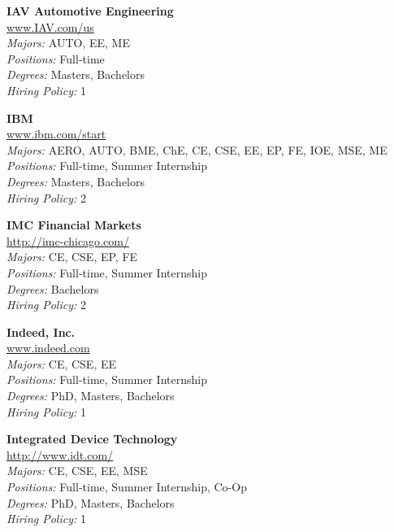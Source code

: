 \documentclass[twoside]{article}
\begin{document}
\begin{center}
\begin{multicols}{3}
\begin{minipage}{.9\columnwidth}{\Large\bf IAV Automotive Engineering }\\
	\url{www.IAV.com/us}\\
	\emph{Majors:} AUTO, EE, ME\\
	\emph{Positions:} Full-time\\
	\emph{Degrees:} Masters, Bachelors\\
	\emph{Hiring Policy:} 1\\
\end{minipage}
 
\begin{minipage}{.9\columnwidth}{\Large\bf IBM }\\
	\url{www.ibm.com/start}\\
	\emph{Majors:} AERO, AUTO, BME, ChE, CE, CSE, EE, EP, FE, IOE, MSE, ME\\
	\emph{Positions:} Full-time, Summer Internship\\
	\emph{Degrees:} Masters, Bachelors\\
	\emph{Hiring Policy:} 2\\
\end{minipage}
 
\begin{minipage}{.9\columnwidth}{\Large\bf IMC Financial Markets }\\
	\url{http://imc-chicago.com/}\\
	\emph{Majors:} CE, CSE, EP, FE\\
	\emph{Positions:} Full-time, Summer Internship\\
	\emph{Degrees:} Bachelors\\
	\emph{Hiring Policy:} 2\\
\end{minipage}
 
\begin{minipage}{.9\columnwidth}{\Large\bf Indeed, Inc. }\\
	\url{www.indeed.com}\\
	\emph{Majors:} CE, CSE, EE\\
	\emph{Positions:} Full-time, Summer Internship\\
	\emph{Degrees:} PhD, Masters, Bachelors\\
	\emph{Hiring Policy:} 1\\
\end{minipage}
 
\begin{minipage}{.9\columnwidth}{\Large\bf Integrated Device Technology }\\
	\url{http://www.idt.com/}\\
	\emph{Majors:} CE, CSE, EE, MSE\\
	\emph{Positions:} Full-time, Summer Internship, Co-Op\\
	\emph{Degrees:} PhD, Masters, Bachelors\\
	\emph{Hiring Policy:} 1\\
\end{minipage}
 

\end{multicols}
\end{center}
\end{document}
